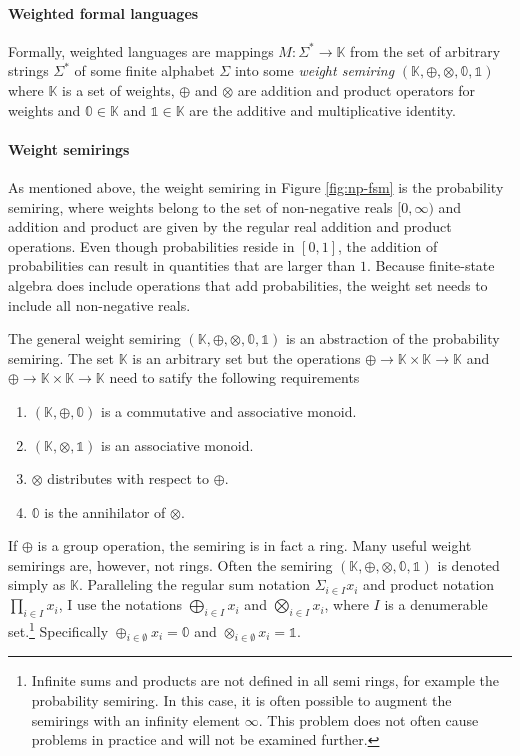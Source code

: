 \paragraph{Weighted formal languages} Formally, weighted languages are
mappings $M : \Sigma^* \rightarrow \mathbb{K}$ from the set of
arbitrary strings $\Sigma^*$ of some finite alphabet $\Sigma$ into
some {\it weight semiring} $(\mathbb{K}, \oplus, \otimes, \mathbb{0},
\mathbb{1})$ where $\mathbb{K}$ is a set of weights, $\oplus$ and
$\otimes$ are addition and product operators for weights and
$\mathbb{0} \in \mathbb{K}$ and $\mathbb{1} \in \mathbb{K}$ are the
additive and multiplicative identity.

\paragraph{Weight semirings} As mentioned above, the weight semiring
in Figure \ref{fig:np-fsm} is the probability semiring, where weights
belong to the set of non-negative reals $[0, \infty)$ and addition and
product are given by the regular real addition and product
operations. Even though probabilities reside in $[0,1]$, the addition
of probabilities can result in quantities that are larger than
$1$. Because finite-state algebra does include operations that add
probabilities, the weight set needs to include all non-negative reals.

The general weight semiring $(\mathbb{K}, \oplus, \otimes, \mathbb{0}, \mathbb{1})$ is an abstraction of the probability semiring. The set $\mathbb{K}$ is an arbitrary set but the operations $\oplus \rightarrow \mathbb{K} \times \mathbb{K} \rightarrow \mathbb{K}$ and $\oplus \rightarrow \mathbb{K} \times \mathbb{K} \rightarrow \mathbb{K}$ need to satify the following requirements \cite{Allauzen2007}
\begin{enumerate}
\item $(\mathbb{K}, \oplus, \mathbb{0})$ is a commutative and associative monoid.
\item $(\mathbb{K}, \otimes, \mathbb{1})$ is an associative monoid.
\item $\otimes$ distributes with respect to $\oplus$.
\item $\mathbb{0}$ is the annihilator of $\otimes$.
\end{enumerate}
If $\oplus$ is a group operation, the semiring is in fact a ring. Many
useful weight semirings are, however, not rings. Often the semiring
$(\mathbb{K}, \oplus, \otimes, \mathbb{0}, \mathbb{1})$ is denoted
simply as $\mathbb{K}$. Paralleling the regular sum notation $\Sigma_{i \in I} x_i$ and product notation $\prod_{i\in I} x_i$, I use the notations $\bigoplus_{i \in I} x_i$ and $\bigotimes_{i \in I} x_i$, where $I$ is a denumerable set.\footnote{Infinite sums and products are not defined in all semi rings, for example the probability semiring. In this case, it is often possible to augment the semirings with an infinity element $\infty$. This problem does not often cause problems in practice and will not be examined further.} Specifically $\oplus_{i \in \emptyset} x_i = \mathbb{0}$ and $\otimes_{i \in \emptyset} x_i = \mathbb{1}$.

